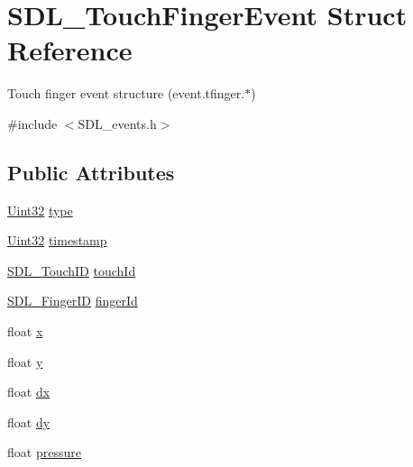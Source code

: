 \hypertarget{struct_s_d_l___touch_finger_event}{\section{S\-D\-L\-\_\-\-Touch\-Finger\-Event Struct Reference}
\label{struct_s_d_l___touch_finger_event}
}


Touch finger event structure (event.\-tfinger.$\ast$)  




{\ttfamily \#include $<$S\-D\-L\-\_\-events.\-h$>$}

\subsection*{Public Attributes}
\begin{DoxyCompactItemize}
\item 
\hyperlink{_s_d_l__stdinc_8h_add440eff171ea5f55cb00c4a9ab8672d}{Uint32} \hyperlink{struct_s_d_l___touch_finger_event_a3883218fa3426065ca66086c100edbfa}{type}
\item 
\hyperlink{_s_d_l__stdinc_8h_add440eff171ea5f55cb00c4a9ab8672d}{Uint32} \hyperlink{struct_s_d_l___touch_finger_event_abde2ab5cb013bbd21e37a65e2f8fa666}{timestamp}
\item 
\hyperlink{_s_d_l__touch_8h_a10f5f86abe4ea8308a8706bd5d3b337a}{S\-D\-L\-\_\-\-Touch\-I\-D} \hyperlink{struct_s_d_l___touch_finger_event_ad7a6f39ec9af1bf47b160d18314edd70}{touch\-Id}
\item 
\hyperlink{_s_d_l__touch_8h_a5fa58141f78415ca09645af359ad2250}{S\-D\-L\-\_\-\-Finger\-I\-D} \hyperlink{struct_s_d_l___touch_finger_event_a8616d46ed19906e3ee90a4d481d3a284}{finger\-Id}
\item 
float \hyperlink{struct_s_d_l___touch_finger_event_a0ce44b1342220fa17e9b9b4a77c2c906}{x}
\item 
float \hyperlink{struct_s_d_l___touch_finger_event_ac2bb8af638d2927a8e13f6ffe8f9384e}{y}
\item 
float \hyperlink{struct_s_d_l___touch_finger_event_ac6acac209d6e2bd659fdb6760081393d}{dx}
\item 
float \hyperlink{struct_s_d_l___touch_finger_event_a9c0320c5f18a6b9d10da657e166608c9}{dy}
\item 
float \hyperlink{struct_s_d_l___touch_finger_event_ab4fca822d0807b5748dbae8d3cc56524}{pressure}
\end{DoxyCompactItemize}



